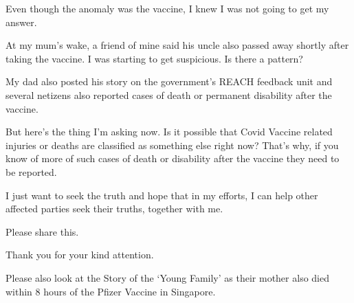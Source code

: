 {Even though the anomaly was the vaccine, I knew I was not going to get my
answer.

At my mum’s wake, a friend of mine said his uncle also passed away shortly after
taking the vaccine. I was starting to get suspicious. Is there a pattern?

My dad also posted his story on the government’s REACH feedback unit and several
netizens also reported cases of death or permanent disability after the vaccine.

But here’s the thing I’m asking now. Is it possible that Covid Vaccine related
injuries or deaths are classified as something else right now? That’s why, if
you know of more of such cases of death or disability after the vaccine they
need to be reported.

I just want to seek the truth and hope that in my efforts, I can help other
affected parties seek their truths, together with me.

Please share this.

Thank you for your kind attention.

Please also look at the Story of the ‘Young Family’ as their mother also died
within 8 hours of the Pfizer Vaccine in Singapore.

}
